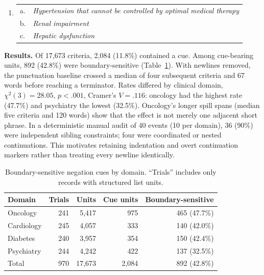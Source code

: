 \documentclass[12pt]{article}
\newcommand{\ex}[1]{\textit{#1}}
\begin{document}
\begin{enumerate}[label=(\arabic*),leftmargin=2.2em,itemsep=0pt,topsep=2pt]
\item \begin{tabular}[t]{@{}ll@{}}
a. & \ex{Hypertension that cannot be controlled by optimal medical therapy}\\
b. & \ex{Renal impairment}\\
c. & \ex{Hepatic dysfunction}
\end{tabular}
\end{enumerate}
\vspace{-0.25em}

\textbf{Results.}
Of 17,673 criteria, 2,084 (11.8\%) contained a cue. Among cue-bearing units,
892 (42.8\%) were boundary-sensitive (Table~\ref{tab:domains}). With newlines
removed, the punctuation baseline crossed a median of four subsequent criteria
and 67 words before reaching a terminator. Rates differed by clinical domain,
$\chi^2(3)=28.05$, $p<.001$, Cramer's $V=.116$: oncology had the highest rate
(47.7\%) and psychiatry the lowest (32.5\%). Oncology's longer spill spans
(median five criteria and 120 words) show that the effect is not merely one
adjacent short phrase. In a deterministic manual audit of 40 events (10 per
domain), 36 (90\%) were independent sibling constraints; four were coordinated
or nested continuations. This motivates retaining indentation and overt
continuation markers rather than treating every newline identically.

\begin{table}[h]
\centering
\caption{Boundary-sensitive negation cues by domain. ``Trials'' includes only
records with structured list units.}
\label{tab:domains}
\vspace{-0.35em}
\begin{tabular}{@{}lrrrr@{}}
\toprule
Domain & Trials & Units & Cue units & Boundary-sensitive\\
\midrule
Oncology   & 241 & 5,417 & 975 & 465 (47.7\%)\\
Cardiology & 245 & 4,057 & 333 & 140 (42.0\%)\\
Diabetes   & 240 & 3,957 & 354 & 150 (42.4\%)\\
Psychiatry & 244 & 4,242 & 422 & 137 (32.5\%)\\
\midrule
Total      & 970 & 17,673 & 2,084 & 892 (42.8\%)\\
\bottomrule
\end{tabular}
\end{table}
\vspace{-0.6em}
\end{document}
